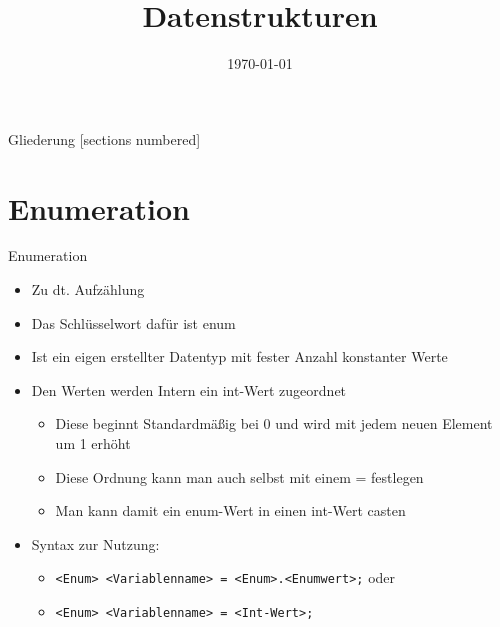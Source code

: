 



\title{Datenstrukturen}
\date{\today}




\maketitle

\begin{frame}{Gliederung}
	[sections numbered]
	\tableofcontents
\end{frame}

\section{Enumeration}
\begin{frame}{Enumeration}
	\begin{itemize}
		\item Zu dt. Aufzählung
		\item Das Schlüsselwort dafür ist \alert{enum}
		\item Ist ein eigen erstellter Datentyp mit fester Anzahl konstanter Werte
		\item Den Werten werden Intern ein \alert{int}-Wert zugeordnet
		\begin{itemize}
			\item Diese beginnt Standardmäßig bei 0 und wird mit jedem neuen Element um 1 erhöht
			\item Diese Ordnung kann man auch selbst mit einem \alert{=} festlegen
			\item Man kann damit ein \alert{enum}-Wert in einen \alert{int}-Wert casten			
		\end{itemize}
		\item Syntax zur Nutzung:
		\begin{itemize}
			\item \texttt{\alert{<Enum> <Variablenname>} = \alert{<Enum>}.\alert{<Enumwert>};} oder
			\item \texttt{\alert{<Enum> <Variablenname>} = \alert{<Int-Wert>};}
		\end{itemize}
	\end{itemize}
\end{frame}

